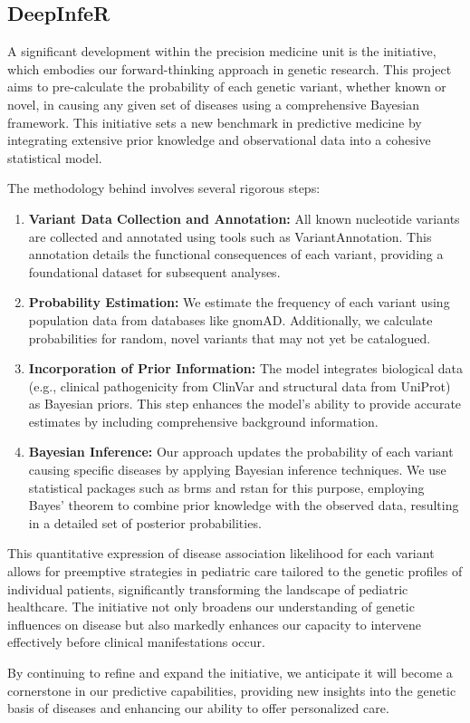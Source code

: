 \subsection{DeepInfeR}

A significant development within the precision medicine unit is the \deepinfer initiative, which embodies our forward-thinking approach in genetic research. This project aims to pre-calculate the probability of each genetic variant, whether known or novel, in causing any given set of diseases using a comprehensive Bayesian framework. This initiative sets a new benchmark in predictive medicine by integrating extensive prior knowledge and observational data into a cohesive statistical model.

The methodology behind \deepinfer involves several rigorous steps:
\begin{enumerate}
    \item \textbf{Variant Data Collection and Annotation:} All known nucleotide variants are collected and annotated using tools such as VariantAnnotation. This annotation details the functional consequences of each variant, providing a foundational dataset for subsequent analyses.
    \item \textbf{Probability Estimation:} We estimate the frequency of each variant using population data from databases like gnomAD. Additionally, we calculate probabilities for random, novel variants that may not yet be catalogued.
    \item \textbf{Incorporation of Prior Information:} The model integrates biological data (e.g., clinical pathogenicity from ClinVar and structural data from UniProt) as Bayesian priors. This step enhances the model's ability to provide accurate estimates by including comprehensive background information.
    \item \textbf{Bayesian Inference:} Our approach updates the probability of each variant causing specific diseases by applying Bayesian inference techniques. We use statistical packages such as brms and rstan for this purpose, employing Bayes' theorem to combine prior knowledge with the observed data, resulting in a detailed set of posterior probabilities.
\end{enumerate}

This quantitative expression of disease association likelihood for each variant allows for preemptive strategies in pediatric care tailored to the genetic profiles of individual patients, significantly transforming the landscape of pediatric healthcare. The \deepinfer initiative not only broadens our understanding of genetic influences on disease but also markedly enhances our capacity to intervene effectively before clinical manifestations occur.

By continuing to refine and expand the \deepinfer initiative, we anticipate it will become a cornerstone in our predictive capabilities, providing new insights into the genetic basis of diseases and enhancing our ability to offer personalized care.
